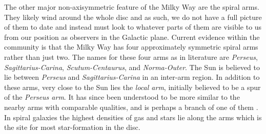 The other major non-axisymmetric feature of the Milky Way are the spiral arms. They likely wind around the whole disc and as such, we do not have a full picture of them to date and instead must look to whatever parts of them are visible to us from our position as observers in the Galactic plane. Current evidence within the community is that the Milky Way has four approximately symmetric spiral arms \citep{reid:19} rather than just two. The names for these four arms as in literature are \textit{Perseus}, \textit{Sagittarius-Carina}, \textit{Scutum-Centaurus}, and \textit{Norma-Outer}. The Sun is believed to lie between \textit{Perseus} and \textit{Sagittarius-Carina} in an inter-arm region. In addition to these arms, very close to the Sun lies the \textit{local arm}, initially believed to be a spur of the \textit{Perseus arm}. It has since been understood to be more similar to the nearby arms with comparable qualities, and is perhaps a branch of one of them \citep{xu:13}. In spiral galaxies the highest densities of gas and stars lie along the arms which is the site for most star-formation in the disc. 

